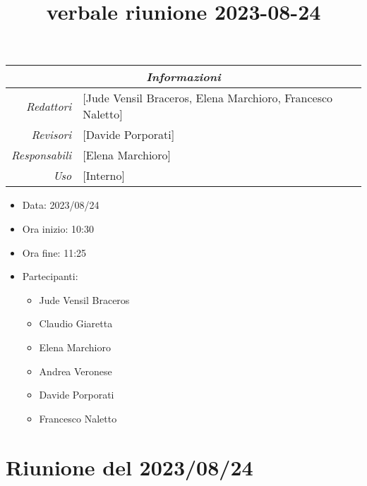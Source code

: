 \documentclass[12pt]{article}
\begin{document}
\graphicspath{ {../../templates/img} }

\title{verbale riunione 2023-08-24}

\firstPage
\maketitle

\begin{center}
\begin{tabular}{r | l}
    \multicolumn{2}{c}{\textit{Informazioni}}\\
    \hline
    
        \textit{Redattori} &
        [Jude Vensil Braceros, Elena Marchioro, Francesco Naletto]\makecell{}\\
    
        \textit{Revisori} &
        [Davide Porporati]\makecell{}\\
        \textit{Responsabili} &
        [Elena Marchioro]\makecell{}\\
            \textit{Uso} & 
            [Interno]\makecell{}\\
\end{tabular}
    \begin{itemize}
    \item[] Data: 2023/08/24
    \item[] Ora inizio: 10:30
    \item[] Ora fine: 11:25
    \item[] Partecipanti:
    \begin{itemize}
    \item[] Jude Vensil Braceros
    \item[] Claudio Giaretta
    \item[] Elena Marchioro
    \item[] Andrea Veronese
    \item[] Davide Porporati
    \item[] Francesco Naletto
    \end{itemize}
\end{itemize}
\end{center}


\tableofcontents
\printindex 
\section{Riunione del 2023/08/24}
\end{document}

